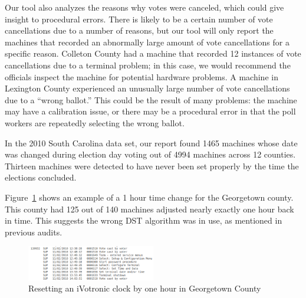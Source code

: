 Our tool also analyzes the reasons why votes were canceled, which
could give insight to procedural errors.  There is likely to be a
certain number of vote cancellations due to a number of reasons, but
our tool will only report the machines that recorded an abnormally
large amount of vote cancellations for a specific reason.  Colleton
County had a machine that recorded 12 instances of vote cancellations
due to a terminal problem; in this case, we would recommend the
officials inspect the machine for potential hardware problems.  A
machine in Lexington County experienced an unusually large number of
vote cancellations due to a \textquotedblleft wrong ballot.'' This
could be the result of many problems: the machine may have a
calibration issue, or there may be a procedural error in that the poll
workers are repeatedly selecting the wrong ballot.

In the 2010 South Carolina data set, our report found 1465 machines
whose date 
was changed during election day voting out of 4994 machines across 12
counties. Thirteen  machines were detected to
have never been set properly by the time the elections concluded.

Figure~\ref{fig:Georgetown} shows an example of a 1 hour time change for the
Georgetown county.  This county had 125 out of 140 machines adjusted nearly
exactly one hour back in time.  This suggests the wrong DST
algorithm was in use, as mentioned in previous audits.~\cite{Buell2011}
\begin{figure}[h!]
  \caption{Resetting an iVotronic clock by one hour in Georgetown
County}
  \label{fig:Georgetown}
  \centering
    \includegraphics[width=0.5\textwidth]{datefig1.png}
\end{figure}

\smvertspace
